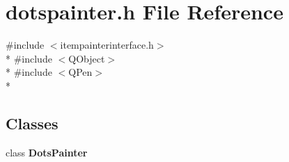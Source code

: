 \section{dotspainter.\+h File Reference}
\label{bk3_2curve_2painters_2dotspainter_8h}
{\ttfamily \#include $<$itempainterinterface.\+h$>$}\\*
{\ttfamily \#include $<$Q\+Object$>$}\\*
{\ttfamily \#include $<$Q\+Pen$>$}\\*
\subsection*{Classes}
\begin{DoxyCompactItemize}
\item 
class {\bf Dots\+Painter}
\end{DoxyCompactItemize}
